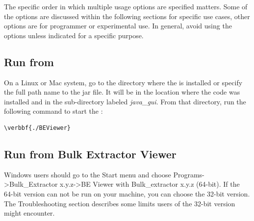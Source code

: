 \documentclass[11pt]{article} %
\begin{document}
The specific order in which multiple usage options are specified matters. Some of the options are discussed within the following sections for specific use cases, other options are for programmer or experimental use. In general, avoid using the options unless indicated for a specific purpose.\\

\subsection{Run \bulk from \viewer}
\label{RunningViewer}

On a Linux or Mac system, go to the directory where the \viewer is installed or specify the full path name to the jar file. It will be in the location where the \bulk code was installed and in the sub-directory labeled \textit{java\_gui}. From that directory, run the following command to start the \viewer:
\begin{Verbatim}[commandchars=\\\{\}]
\verbbf{./BEViewer}
\end{Verbatim}

\subsection {Run \bulk from Bulk Extractor Viewer}

Windows users should go to the Start menu and choose Programs->Bulk\_Extractor x.y.z->BE Viewer with Bulk\_extractor x.y.z (64-bit). If the 64-bit version can not be run on your machine, you can choose the 32-bit version. The Troubleshooting section describes some limits users of the 32-bit version might encounter.\\
\end{document}
